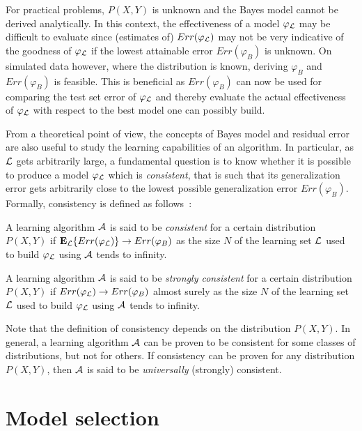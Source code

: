 For practical problems, $P(X, Y)$ is unknown and the Bayes model cannot be
derived analytically. In this context, the effectiveness of a model $\varphi_{\cal L}$
may be difficult to evaluate since (estimates of) $Err(\varphi_{\cal L})$ may
not be very indicative of the goodness of $\varphi_{\cal L}$ if the lowest attainable
error $Err(\varphi_B)$ is unknown. On simulated data however, where the
distribution is known, deriving $\varphi_B$ and $Err(\varphi_B)$ is feasible.
This is beneficial as $Err(\varphi_B)$ can now be used for comparing the test
set error of $\varphi_{\cal L}$ and thereby evaluate the actual effectiveness of
$\varphi_{\cal L}$ with respect to the best model one can possibly build.

From a theoretical point of view, the concepts of Bayes model and residual
error are also useful to study the learning capabilities of an algorithm. In
particular, as ${\cal L}$ gets arbitrarily large, a fundamental question is to
know whether it is possible to produce a model $\varphi_{\cal L}$ which is
\textit{consistent}, that is such that its generalization error gets
arbitrarily close to the lowest possible generalization error $Err(\varphi_B)$.
Formally, consistency is defined as follows~\citep{devroye:1996}:

\begin{definition}
A learning algorithm ${\cal A}$ is said to be \emph{consistent} for a certain distribution
$P(X, Y)$ if $\mathbf{E}_{\cal L} \{ Err(\varphi_{\cal L}) \} \to Err(\varphi_B)$
as the size $N$ of the learning set ${\cal L}$ used to build $\varphi_{\cal L}$ using ${\cal A}$ tends
to infinity.
\end{definition}

\begin{definition}
A learning algorithm ${\cal A}$ is said to be \emph{strongly consistent} for a certain distribution
$P(X, Y)$ if $Err(\varphi_{\cal L}) \to Err(\varphi_B)$ almost surely
as the size $N$ of the learning set ${\cal L}$ used to build $\varphi_{\cal L}$ using ${\cal A}$ tends
to infinity.
\end{definition}

Note that the definition of consistency depends on the distribution $P(X, Y)$.
In general, a learning algorithm ${\cal A}$ can be proven to be consistent for some
classes of distributions, but not for others. If consistency can be proven
for any distribution $P(X, Y)$, then ${\cal A}$ is said to be \textit{universally}
(strongly) consistent.


\section{Model selection}
\label{sec:2:model-selection}

